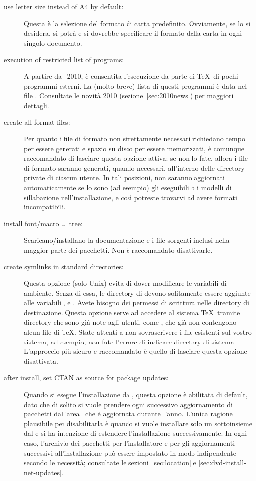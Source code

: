 \documentclass{article}
\begin{document}
\begin{description}
\item[use letter size instead of A4 by default:]
  Questa è la selezione del formato di carta predefinito. Ovviamente, se
  lo si desidera, si potrà e si dovrebbe specificare il formato della
  carta in ogni singolo documento.

\item[execution of restricted list of programs:] A partire da \TL\ 2010,
  è consentita l'esecuzione da parte di \TeX\ di pochi programmi esterni.
  La (molto breve) lista di questi programmi è data nel file
  . Consultate le novità 2010
  (sezione~\ref{sec:2010news}) per maggiori dettagli.

\item[create all format files:] Per quanto i file di formato non
  strettamente necessari richiedano tempo per essere generati e spazio su
  disco per essere memorizzati, è comunque raccomandato di lasciare questa
  opzione attiva: se non lo fate, allora i file di formato saranno
  generati, quando necessari, all'interno delle directory private
   di ciascun utente. In tali posizioni, non saranno
  aggiornati automaticamente se lo sono (ad esempio) gli eseguibili o i
  modelli di sillabazione nell'installazione, e così potreste trovarvi ad
  avere formati incompatibili.

\item[install font/macro \ldots\ tree:] Scaricano/installano 
  la documentazione e i file sorgenti inclusi nella
  maggior parte dei pacchetti. Non è raccomandato disattivarle.

\item[create symlinks in standard directories:] Questa opzione
  (solo Unix) evita di dover modificare le variabili di ambiente.
  Senza di essa, le directory di \TL{} devono solitamente essere aggiunte
  alle variabili ,  e .
  Avete bisogno dei permessi di scrittura nelle directory di destinazione.
  Questa opzione serve ad accedere al sistema \TeX\ tramite directory che
  sono già note agli utenti, come , che già non
  contengono alcun file di \TeX. State attenti a non sovrascrivere i file 
  esistenti sul
  vostro sistema, ad esempio, non fate l'errore di indicare directory di 
  sistema. L'approccio
  più sicuro e raccomandato è quello di lasciare questa opzione
  disattivata.

\item[after install, set CTAN as source for package updates:]
  Quando si esegue l'installazione
  da \DVD, questa opzione è abilitata di default, dato che di solito si
  vuole prendere ogni successivo aggiornamento di pacchetti dall'area
  \CTAN\ che è aggiornata durante l'anno. L'unica ragione plausibile per
  disabilitarla è quando si vuole installare solo un sottoinsieme dal \DVD
  e si ha intenzione di estendere l'installazione successivamente. In
  ogni caso, l'archivio dei pacchetti per l'installatore e per gli
  aggiornamenti successivi all'installazione può essere impostato in modo
  indipendente secondo le necessità; consultate le sezioni~\ref{sec:location}
  e \ref{sec:dvd-install-net-updates}.
\end{description}
\end{document}
